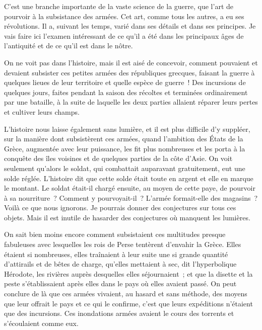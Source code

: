 \documentclass[french,twoside]{book} %
\begin{document}
\noindent C’est une branche importante de la vaste science de la guerre, que l’art de pourvoir à la subsistance des armées. Cet art, comme tous les autres, a eu ses révolutions. Il a, suivant les temps, varié dans ses détails et dans ses principes. Je vais faire ici l’examen intéressant de ce qu’il a été dans les principaux âges de l’antiquité et de ce qu’il est dans le nôtre.\par
On ne voit pas dans l’histoire, mais il est aisé de concevoir, comment pouvaient et devaient subsister ces petites armées des républiques grecques, faisant la guerre à quelques lieues de leur territoire et quelle espèce de guerre ! Des incursions de quelques jours, faites pendant la saison des récoltes et terminées ordinairement par une bataille, à la suite de laquelle les deux parties allaient réparer leurs pertes et cultiver leurs champs.\par
L’histoire nous laisse également sans lumière, et il est plus difficile d’y suppléer, sur la manière dont subsistèrent ces armées, quand l’ambition des États de la Grèce, augmentée avec leur puissance, les fit plus nombreuses et les porta à la conquête des îles voisines et de quelques parties de la côte d’Asie. On voit seulement qu’alors le soldat, qui combattait auparavant gratuitement, eut une solde réglée. L’histoire dit que cette solde était toute en argent et elle en marque le montant. Le soldat était-il chargé ensuite, au moyen de cette paye, de pourvoir à sa nourriture ? Comment y pourvoyait-il ? L’armée formait-elle des magasins ? Voilà ce que nous ignorons. Je pourrais donner des conjectures sur tous ces objets. Mais il est inutile de hasarder des conjectures où manquent les lumières.\par
On sait bien moins encore comment subsistaient ces multitudes presque fabuleuses avec lesquelles les rois de Perse tentèrent d’envahir la Grèce. Elles étaient si nombreuses, elles traînaient à leur suite une si grande quantité d’attirails et de bêtes de charge, qu’elles mettaient à sec, dit l’hyperbolique Hérodote, les rivières auprès desquelles elles séjournaient ; et que la disette et la peste s’établissaient après elles dans le pays où elles avaient passé. On peut conclure de là que ces armées vivaient, au hasard et sans méthode, des moyens que leur offrait le pays et ce qui le confirme, c’est que leurs expéditions n’étaient que des incursions. Ces inondations armées avaient le cours des torrents et s’écoulaient comme eux.\par
\end{document}
